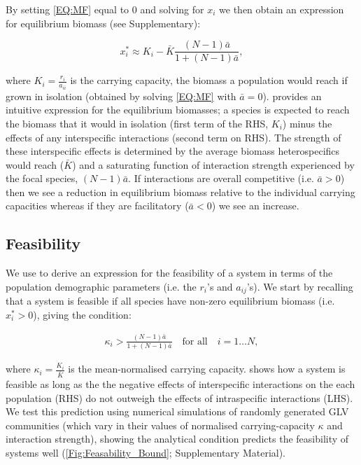 \documentclass{article}
\begin{document}
By setting \cref{EQ:MF} equal to $0$ and solving for $x_i$ we then obtain an expression for equilibrium biomass (see Supplementary):

\begin{equation}\label{EQ:MF_eqi}
  x^*_i \approx K_i -  \bar{K}  \frac{ (N-1)\bar{a}}{1 + (N-1)\bar{a}}, 
\end{equation}

where $K_i = \frac{r_i}{a_{ii}}$ is the carrying capacity, the biomass a population would reach if grown in isolation (obtained by solving \cref{EQ:MF} with $\bar{a} = 0$).  provides an intuitive expression for the equilibrium biomasses; a species is expected to reach the biomass that it would in isolation (first term of the RHS, $K_i$) minus the effects of any interspecific interactions (second term on RHS). The strength of these interspecific effects is determined by the average biomass heterospecifics would reach ($\bar{K}$) and a saturating function of interaction strength experienced by the focal species, $(N-1)\bar{a}$. If interactions are overall competitive (i.e. $ \bar{a} > 0$) then we see a reduction in equilibrium biomass relative to the individual carrying capacities whereas if they are facilitatory ($ \bar{a} < 0$) we see an increase.  

\subsection{Feasibility} \label{Sec:Feasibility}
We use  to derive an expression for the feasibility of a system in terms of the population demographic parameters (i.e. the $r_i$'s and $a_{ij}$'s). We start by recalling that a system is feasible if all species have non-zero equilibrium biomass (i.e. $x_i^* > 0 $), giving the condition:

\begin{align} \label{EQ:Feas_sp}
  \kappa_i > \frac{(N-1)\bar{a}}{1 + (N-1)\bar{a}} \quad \text{for all} \quad i = 1 \ldots N,
\end{align}

where $\kappa_i = \frac{K_i}{\bar{K}}$ is the mean-normalised carrying capacity.  shows how a system is feasible as long as the the negative effects of interspecific interactions on the each population (RHS) do not outweigh the effects of intraspecific interactions (LHS). We test this prediction using numerical simulations of randomly generated GLV communities (which vary in their values of normalised carrying-capacity $\kappa$ and interaction strength), showing the analytical condition predicts the feasibility of systems well (\cref{Fig:Feasability_Bound}; Supplementary Material). 
\end{document}
